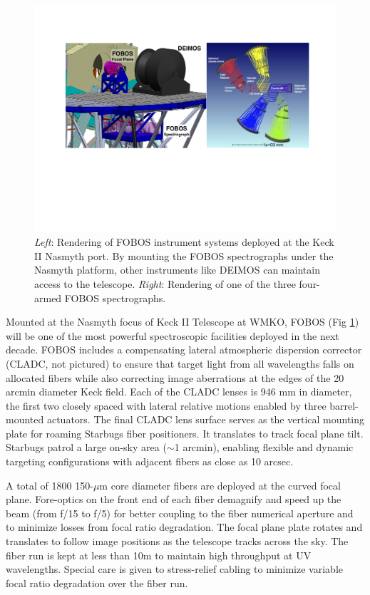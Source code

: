 \documentclass[oneside,11pt]{amsart}
\begin{document}
\begin{figure}[h!]
%
\vskip -0.1in
%
\includegraphics[width=\textwidth]{figs/FOBOS_inst.pdf}
%
\caption{\small {\it Left}: Rendering of FOBOS instrument systems
deployed at the Keck II Nasmyth port.  By mounting the FOBOS
spectrographs under the Nasmyth platform, other instruments like DEIMOS
can maintain access to the telescope. {\it Right}: Rendering of one of
the three four-armed FOBOS spectrographs.}
%
\label{fig:layout}
%
\end{figure}

Mounted at the Nasmyth focus of Keck II Telescope at WMKO, FOBOS (Fig
\ref{fig:layout}) will be one of the most powerful spectroscopic
facilities deployed in the next decade.  FOBOS includes a compensating lateral
atmospheric dispersion corrector (CLADC, not pictured) to ensure that
target light from all wavelengths falls on allocated fibers while also
correcting image aberrations at the edges of the 20 arcmin diameter Keck
field.  Each of the CLADC lenses is 946 mm in diameter, the first two
closely spaced with lateral relative motions enabled by three
barrel-mounted actuators.  The final CLADC lens surface serves as the
vertical mounting plate for roaming Starbugs fiber positioners.  It
translates to track focal plane tilt.  Starbugs patrol a large on-sky
area ($\sim$1 arcmin), enabling flexible and dynamic targeting
configurations with adjacent fibers as close as 10 arcsec.

A total of 1800 150-$\mu$m core diameter fibers are deployed at the curved focal plane.  Fore-optics on the front end
of each fiber demagnify and speed up the beam (from f/15 to f/5) for better coupling to the fiber numerical aperture
and to minimize losses from focal ratio degradation.  The focal plane plate rotates and translates to follow image
positions as the telescope tracks across the sky.  The fiber run is kept at less than 10m to maintain high throughput
at UV wavelengths.  Special care is given to stress-relief cabling to minimize variable focal ratio degradation over
the fiber run.
\end{document}
